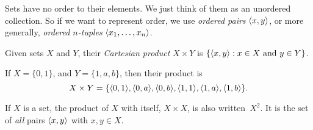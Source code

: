 \documentclass[../../include/open-logic-section]{subfiles}
\begin{document}

\begin{explain}
Sets have no order to their elements. We just think of them as an
unordered collection. So if we want to represent order, we use
\emph{ordered pairs} $\langle x, y \rangle$, or more generally,
\emph{ordered $n$-tuples} $\langle x_1, \dots, x_n \rangle$.
\end{explain}

\begin{defn} 
Given sets $X$ and $Y$, their \emph{Cartesian product} $X \times Y$ is
$\{ \langle x, y \rangle : x \in X \text{ and } y \in Y \}$.
\end{defn}

\begin{ex}
If $X = \{0, 1\}$, and $Y = \{1, a, b\}$, then their product is
\[
X \times Y = \{ \langle 0, 1 \rangle, \langle 0, a \rangle, \langle 0, b \rangle,
    \langle 1, 1 \rangle, \langle 1, a \rangle, \langle 1, b \rangle \}.
\]
\end{ex}

\begin{ex}
If $X$ is a set, the product of $X$ with itself, $X \times X$, is also
written~$X^2$. It is the set of \emph{all} pairs $\langle x, y \rangle$ with
$x, y \in X$.
\end{ex}
\end{document}
